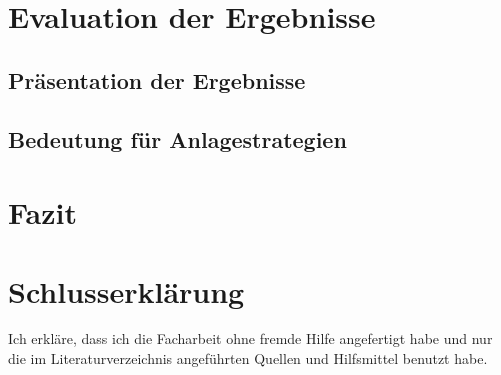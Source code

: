 \documentclass[12pt, a4paper, titlepage]{report}
\begin{document}
    \chapter{Evaluation der Ergebnisse}

        \section{Präsentation der Ergebnisse}

        \section{Bedeutung für Anlagestrategien}

    \chapter{Fazit}

    \chapter{Schlusserklärung}
        Ich erkläre, dass ich die Facharbeit ohne fremde Hilfe angefertigt habe
        und nur die im Literaturverzeichnis angeführten Quellen und Hilfsmittel benutzt habe.
        
    \printbibliography
\end{document}
